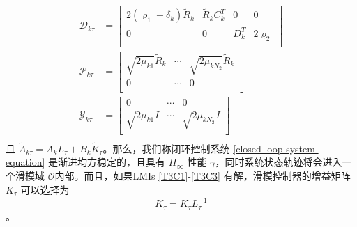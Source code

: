 \begin{equation}
\begin{split}
	\mathscr{D}_{k\tau } &= \begin{bmatrix}
	2(\varrho_{1}+ \delta_{k} )\tilde{R}_{k}& \tilde{R}_{k}C^{T}_{k}&0&0\\
	0&0&D^{T}_{k}&2\varrho_{2} \\
	\end{bmatrix} \\	
	\mathscr{P}_{k\tau } &= \begin{bmatrix}
	\sqrt{2\mu_{k1}} \tilde{R}_{k} &\cdots &\sqrt{2\mu_{kN_{2}}} \tilde{R}_{k}\\
	0 & \cdots & 0\\
	\end{bmatrix}	\\
	\mathscr{Y}_{k\tau } &= \begin{bmatrix}
	0 & \cdots & 0\\
	\sqrt{2\mu_{k1}} I &\cdots &\sqrt{2\mu_{kN_{2}}} I\\
	\end{bmatrix}	\\						
	\end{split}
	\end{equation}
	且 $\tilde{A}_{k\tau } =  A_{k}L_{\tau } + B_{k}\tilde{K}_{\tau }$。那么，我们称闭环控制系统 \eqref{closed-loop-system-equation} 是渐进均方稳定的，且具有 $H_{\infty}$ 性能 $\gamma$，同时系统状态轨迹将会进入一个滑模域 $\mathcal{O}$内部。而且，如果LMIs \eqref{T3C1}-\eqref{T3C3} 有解，滑模控制器的增益矩阵$K_{\tau }$ 可以选择为
	\begin{equation}
	K_{\tau } = \tilde{K}_{\tau }L^{-1}_{\tau }
	\end{equation}。\
	
